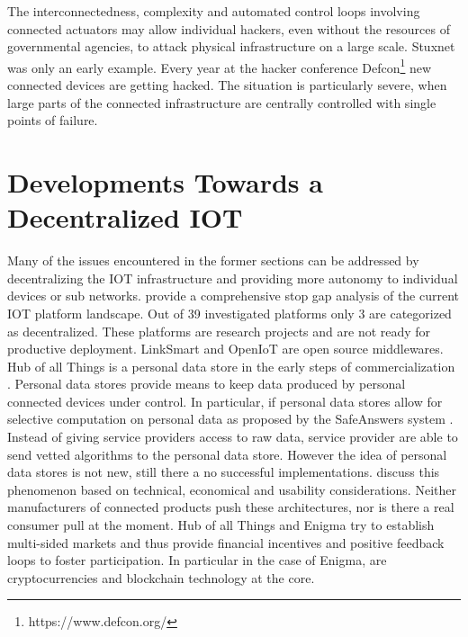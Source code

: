 The interconnectedness, complexity and automated control loops involving connected actuators may allow individual hackers, even without the resources of governmental agencies, to attack physical infrastructure on a large scale. Stuxnet \parencite{5772960} was only an early example. Every year at the hacker conference Defcon\footnote{https://www.defcon.org/} new connected devices are getting hacked. The situation is particularly severe, when large parts of the connected infrastructure are centrally controlled with single points of failure. 


\section{Developments Towards a Decentralized IOT}

Many of the issues encountered in the former sections can be addressed by decentralizing the \ac{IOT} infrastructure and providing more autonomy to individual devices or sub networks. \cite{ISI:000379632700002} provide a comprehensive stop gap analysis of the current \ac{IOT} platform landscape. Out of 39 investigated platforms only 3 are categorized as decentralized. These platforms are research projects and are not ready for productive deployment. LinkSmart and OpenIoT are open source middlewares. Hub of all Things is a personal data store in the early steps of commercialization \parencite{ng2014engineering}. Personal data stores provide means to keep data produced by personal connected devices under control. In particular, if personal data stores allow for selective computation on personal data as proposed by the SafeAnswers system \parencite{10.1371/journal.pone.0098790}. Instead of giving service providers access to raw data, service provider are able to send vetted algorithms to the personal data store. However the idea of personal data stores is not new, still there a no successful implementations. \cite{DBLP:journals/corr/abs-1202-4503} discuss this phenomenon based on technical, economical and usability considerations. Neither manufacturers of connected products push these architectures, nor is there a real consumer pull at the moment. Hub of all Things and Enigma \parencite{7163223} try to establish multi-sided markets and thus provide financial incentives and positive feedback loops to foster participation. In particular in the case of Enigma, are cryptocurrencies and blockchain technology at the core.

